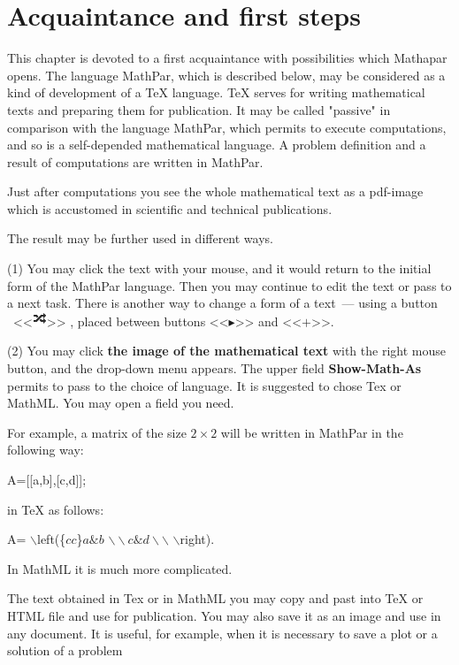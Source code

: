 \chapter{Acquaintance and first steps }
This chapter is devoted to a first acquaintance with possibilities which Mathapar opens.
The language MathPar, which is described below, may be considered as a kind of development of a TeX language.
TeX serves for writing mathematical texts and preparing them for publication. It may be called "passive" 
in comparison with the language MathPar, which permits to execute computations, and so is a self-depended mathematical language. A problem definition and a result of computations are written in MathPar.

Just after computations you see the whole mathematical text  as a pdf-image which is accustomed 
in scientific and technical publications.

The result may be further used in different ways.

(1) You may click the text with your mouse, and it would return to the initial form of the MathPar language. 
Then you may continue to edit the text or pass to a next task. There is another way to change a form  of a text~--- 
using a button%
\ <<\includegraphics[scale=0.6]{pictures/button_arrows.png}>>%
, placed between buttons <<$\blacktriangleright$>> and <<$+$>>.
 

(2) You may click {\bf the image of the mathematical text} with the right mouse button, and the drop-down menu appears. The upper field {\bf Show-Math-As} permits to pass to the choice of language. 
It is suggested to chose  
Tex or MathML. You may open a field you need.

For example, a matrix of the size $2\times 2$ will be written in MathPar in the following way:

A=[[a,b],[c,d]];

in TeX as follows:

A= $\backslash$left(\{${cc}$\}$ a \& b$ $\backslash\backslash c \& d \backslash\backslash$ $\backslash$right).

In MathML it is much more complicated.

The text obtained in Tex or in MathML you may copy and past into TeX or HTML file and use for publication. You may also save it as an image and use in any document. It is useful, for example, when it is necessary to save a plot or a solution of a problem 


